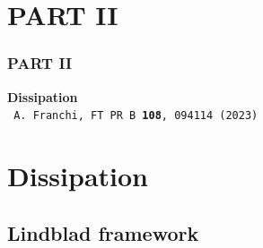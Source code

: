 \section{PART II}

\begin{frame}
	\frametitle{\Large{\rm PART II}}

\begin{center}
	{\LARGE{ \bf Dissipation}\\}
	\medskip
	\medskip
	\medskip
	\texttt{ \Large
  A. Franchi, FT PR B \textbf{108}, 094114 (2023) }
\end{center}
\end{frame}

\section{Dissipation}
	\subsection{Lindblad framework}

